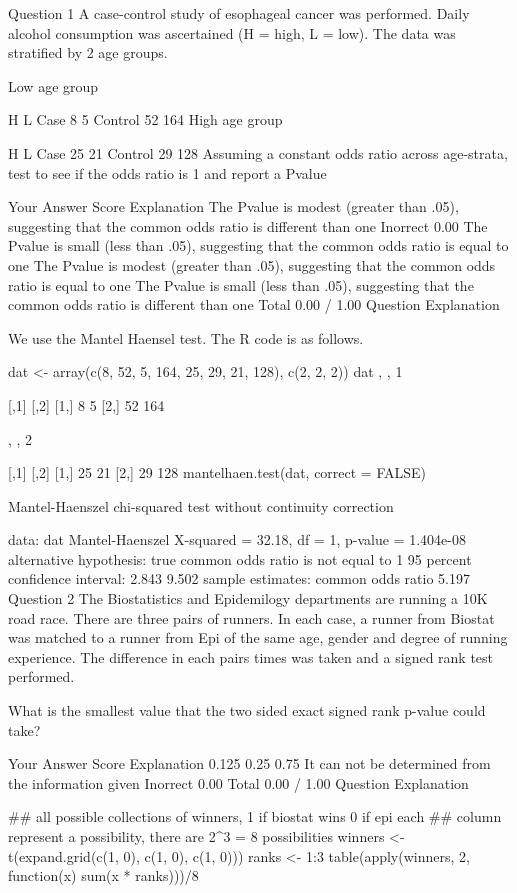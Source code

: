 Question 1
A case-control study of esophageal cancer was performed. Daily alcohol consumption was ascertained (H = high, L = low). The data was stratified by 2 age groups.

Low age group

H	L
Case	8	5
Control	52	164
High age group

H	L
Case	25	21
Control	29	128
Assuming a constant odds ratio across age-strata, test to see if the odds ratio is 1 and report a Pvalue

Your Answer		Score	Explanation
The Pvalue is modest (greater than .05), suggesting that the common odds ratio is different than one	Inorrect	0.00	
The Pvalue is small (less than .05), suggesting that the common odds ratio is equal to one			
The Pvalue is modest (greater than .05), suggesting that the common odds ratio is equal to one			
The Pvalue is small (less than .05), suggesting that the common odds ratio is different than one			
Total		0.00 / 1.00	
Question Explanation

We use the Mantel Haensel test. The R code is as follows.

dat <- array(c(8, 52, 5, 164, 25, 29, 21, 128), c(2, 2, 2))
dat
, , 1

     [,1] [,2]
[1,]    8    5
[2,]   52  164

, , 2

     [,1] [,2]
[1,]   25   21
[2,]   29  128
mantelhaen.test(dat, correct = FALSE)

    Mantel-Haenszel chi-squared test without continuity correction

data:  dat 
Mantel-Haenszel X-squared = 32.18, df = 1, p-value = 1.404e-08
alternative hypothesis: true common odds ratio is not equal to 1 
95 percent confidence interval:
 2.843 9.502 
sample estimates:
common odds ratio 
            5.197 
Question 2
The Biostatistics and Epidemilogy departments are running a 10K road race. There are three pairs of runners. In each case, a runner from Biostat was matched to a runner from Epi of the same age, gender and degree of running experience. The difference in each pairs times was taken and a signed rank test performed.

What is the smallest value that the two sided exact signed rank p-value could take?

Your Answer		Score	Explanation
0.125			
0.25			
0.75			
It can not be determined from the information given	Inorrect	0.00	
Total		0.00 / 1.00	
Question Explanation

## all possible collections of winners, 1 if biostat wins 0 if epi each
## column represent a possibility, there are 2^3 = 8 possibilities
winners <- t(expand.grid(c(1, 0), c(1, 0), c(1, 0)))
ranks <- 1:3
table(apply(winners, 2, function(x) sum(x * ranks)))/8

